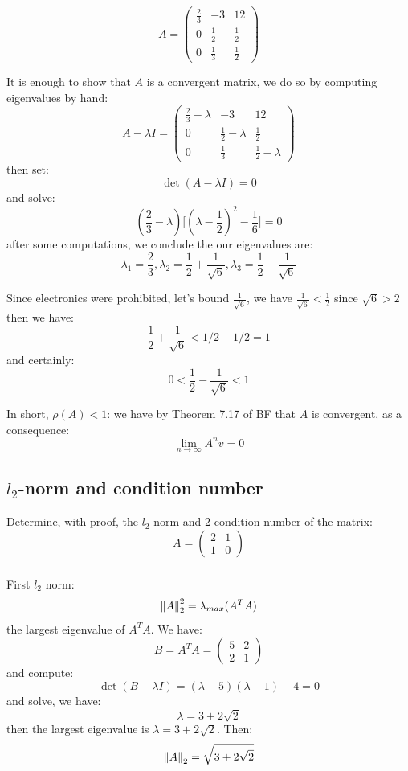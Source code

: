 \documentclass[12pt]{article} %
\newcommand{\ntoinf}[1]{\lim_{{#1}\rightarrow \infty}}
\newcommand{\1}[1]{\mathds{1}\left[#1\right]}
\begin{document}
\subsubsection{}
$$
A = 
\begin{pmatrix}
	\frac23& -3& 12\\
    0& \frac12& \frac12\\
    0& \frac13& \frac12
\end{pmatrix}
$$ 

It is enough to show that $A$ is a convergent matrix, we do so by computing eigenvalues by hand:
$$
	A - \lambda I = 
	\begin{pmatrix}
	\frac23-\lambda& -3& 12\\
    0& \frac12-\lambda& \frac12\\
    0& \frac13& \frac12-\lambda
\end{pmatrix}
$$ then set:
$$
	\det(A-\lambda I) = 0
$$ and solve:
$$
(\frac23-\lambda)\bigg[
(\lambda-\frac12)^2 - \frac16
\bigg] = 0
$$ after some computations, we conclude the our eigenvalues are:
$$
	\lambda_1 = \frac23, \lambda_2 = \frac{1}{2}+\frac{1}{\sqrt{6}}, \lambda_3 = \frac{1}{2}-\frac{1}{\sqrt{6}}
$$

Since electronics were prohibited, let's bound $\frac{1}{\sqrt{6}}$, we have $\frac{1}{\sqrt{6}} < \frac12$ since $\sqrt{6} > 2$ then we have:
$$
\frac12 + \frac{1}{\sqrt{6}} < 1/2 + 1/2 = 1
$$ and certainly:
$$
	0<\frac12 - \frac{1}{\sqrt{6}}<1
$$

In short, $\rho(A) < 1$: we have by Theorem 7.17 of BF that $A$ is convergent, as a consequence:
$$
	\ntoinf{n}A^nv = 0
$$


\subsection{${l}_2$-norm and condition number}
Determine, with proof, the $l_2$-norm and 2-condition number of the matrix:
$$
	A=
	\begin{pmatrix}
		2 & 1\\
		1 & 0
	\end{pmatrix}
$$

\subsubsection{}
First $l_2$ norm:
$$
	\norm{A}_2^2 = \lambda_{max}(A^TA)
$$ the largest eigenvalue of $A^TA$. We have:
$$
	B = A^TA = 
	\begin{pmatrix}
		5 & 2 \\
		2 & 1
	\end{pmatrix}
$$ and compute:
$$
	\det(B - \lambda I) = (\lambda-5)(\lambda-1)-4=0
$$ and solve, we have:
$$
\lambda = 3\pm 2\sqrt{2}
$$ then the largest eigenvalue is $\lambda = 3+2\sqrt{2}$. Then:
$$
	\norm{A}_2 = \sqrt{3+2\sqrt{2}}
$$
\end{document}
